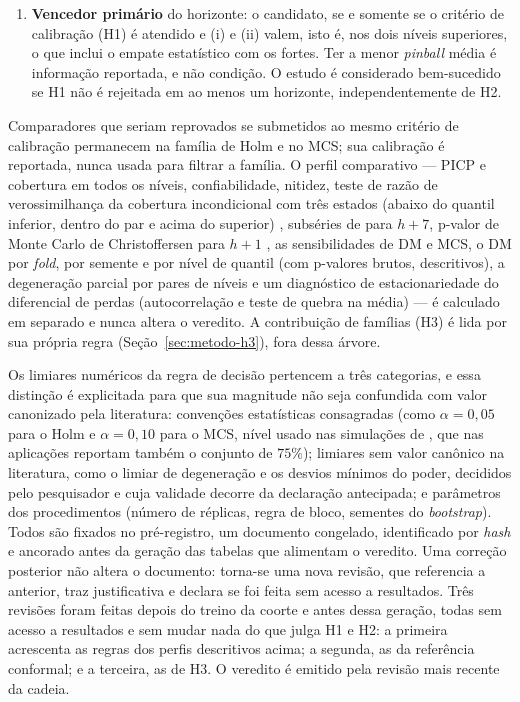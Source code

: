 \begin{enumerate}
    \item \textbf{Vencedor primário} do horizonte: o candidato, se e somente se o critério de calibração (H1) é atendido e (i) e (ii) valem, isto é, nos dois níveis superiores, o que inclui o empate estatístico com os fortes. Ter a menor \textit{pinball} média é informação reportada, e não condição. O estudo é considerado bem-sucedido se H1 não é rejeitada em ao menos um horizonte, independentemente de H2.
\end{enumerate}

Comparadores que seriam reprovados se submetidos ao mesmo critério de calibração permanecem na família de Holm e no MCS; sua calibração é reportada, nunca usada para filtrar a família. O perfil comparativo --- PICP e cobertura em todos os níveis, confiabilidade, nitidez, teste de razão de verossimilhança da cobertura incondicional com três estados (abaixo do quantil inferior, dentro do par e acima do superior) \cite{CHRISTOFFERSEN1998}, subséries de  para \(h+7\), p-valor de Monte Carlo de Christoffersen para \(h+1\) \cite{DUFOUR2006,CHRISTOFFERSENPELLETIER2004}, as sensibilidades de DM e MCS, o DM por \textit{fold}, por semente e por nível de quantil (com p-valores brutos, descritivos), a degeneração parcial por pares de níveis e um diagnóstico de estacionariedade do diferencial de perdas (autocorrelação e teste de quebra na média) --- é calculado em separado e nunca altera o veredito. A contribuição de famílias (H3) é lida por sua própria regra (Seção~\ref{sec:metodo-h3}), fora dessa árvore.

Os limiares numéricos da regra de decisão pertencem a três categorias, e essa distinção é explicitada para que sua magnitude não seja confundida com valor canonizado pela literatura: convenções estatísticas consagradas (como \(\alpha = 0{,}05\) para o Holm e \(\alpha = 0{,}10\) para o MCS, nível usado nas simulações de , que nas aplicações reportam também o conjunto de \(75\%\)); limiares sem valor canônico na literatura, como o limiar de degeneração e os desvios mínimos do poder, decididos pelo pesquisador e cuja validade decorre da declaração antecipada; e parâmetros dos procedimentos (número de réplicas, regra de bloco, sementes do \textit{bootstrap}). Todos são fixados no pré-registro, um documento congelado, identificado por \textit{hash} e ancorado antes da geração das tabelas que alimentam o veredito. Uma correção posterior não altera o documento: torna-se uma nova revisão, que referencia a anterior, traz justificativa e declara se foi feita sem acesso a resultados. Três revisões foram feitas depois do treino da coorte e antes dessa geração, todas sem acesso a resultados e sem mudar nada do que julga H1 e H2: a primeira acrescenta as regras dos perfis descritivos acima; a segunda, as da referência conformal; e a terceira, as de H3. O veredito é emitido pela revisão mais recente da cadeia.

